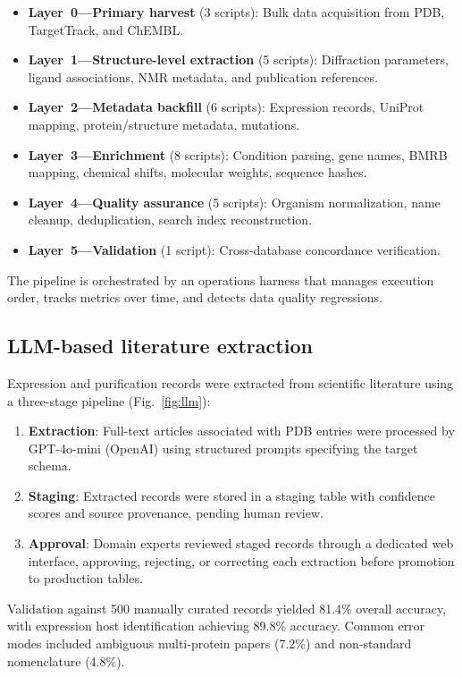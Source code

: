\documentclass[11pt]{article}
\begin{document}
\begin{itemize}
  \item \textbf{Layer~0---Primary harvest} (3 scripts): Bulk data acquisition from PDB, TargetTrack, and ChEMBL.
  \item \textbf{Layer~1---Structure-level extraction} (5 scripts): Diffraction parameters, ligand associations, NMR metadata, and publication references.
  \item \textbf{Layer~2---Metadata backfill} (6 scripts): Expression records, UniProt mapping, protein/structure metadata, mutations.
  \item \textbf{Layer~3---Enrichment} (8 scripts): Condition parsing, gene names, BMRB mapping, chemical shifts, molecular weights, sequence hashes.
  \item \textbf{Layer~4---Quality assurance} (5 scripts): Organism normalization, name cleanup, deduplication, search index reconstruction.
  \item \textbf{Layer~5---Validation} (1 script): Cross-database concordance verification.
\end{itemize}

The pipeline is orchestrated by an operations harness that manages execution order, tracks metrics over time, and detects data quality regressions.

\subsection*{LLM-based literature extraction}

Expression and purification records were extracted from scientific literature using a three-stage pipeline (Fig.~\ref{fig:llm}):

\begin{enumerate}
  \item \textbf{Extraction}: Full-text articles associated with PDB entries were processed by GPT-4o-mini (OpenAI) using structured prompts specifying the target schema.
  \item \textbf{Staging}: Extracted records were stored in a staging table with confidence scores and source provenance, pending human review.
  \item \textbf{Approval}: Domain experts reviewed staged records through a dedicated web interface, approving, rejecting, or correcting each extraction before promotion to production tables.
\end{enumerate}

Validation against 500 manually curated records yielded 81.4\% overall accuracy, with expression host identification achieving 89.8\% accuracy. Common error modes included ambiguous multi-protein papers (7.2\%) and non-standard nomenclature (4.8\%).
\end{document}
